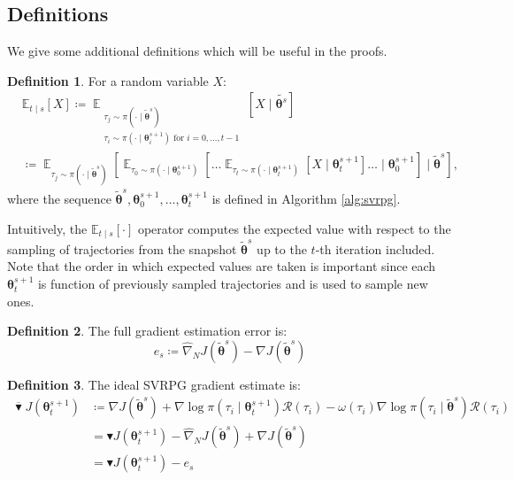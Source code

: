 \documentclass{article}
\theoremstyle{remark}
\theoremstyle{definition}
\newtheorem{definition}{Definition}[section]
\DeclareMathOperator*{\EV}{\mathbb{E}}
\newcommand{\EVV}[2][\ppvect \in \ppspace]{\EV_{#1}\left[{#2}\right]}
\newcommand{\vtheta}{\boldsymbol{\theta}}
\newcommand{\Reward}{\mathcal{R}}
\newcommand{\gradJ}[1]{\nabla J(#1)}
\newcommand{\gradApp}[2]{\hat{\nabla}_{#2}J(#1)}
\newcommand{\Ets}[2][t]{\mathbb{E}_{#1\mid s}\left[#2\right]}
\newcommand{\gradBlack}[1]{\blacktriangledown J(#1)}
\begin{document}
\subsection*{Definitions}
We give some additional definitions which will be useful in the proofs.
\begin{definition}
For a random variable $X$:
\begin{align*}
	&\mathbb{E}_{t\mid s}\left[X\right] \coloneqq 
		\mathop{\mathbb{E}}_{\substack{\tau_j\sim\pi(\cdot\mid\tilde{\vtheta}^s) \\ \tau_i\sim\pi(\cdot\mid\vtheta^{s+1}_i)\text{ for $i=0,\dots,t-1$}}}{\left[X \mid \tilde{\vtheta^s}\right]} \\
	&\coloneqq \EVV[\tau_j\sim\pi(\cdot\mid\tilde{\vtheta}^s)]{
			\EVV[\tau_0\sim\pi(\cdot\mid\vtheta_0^{s+1})]
				{\dots
					\EVV[\tau_t\sim\pi(\cdot\mid\vtheta_t^{s+1})]
						{X\mid\vtheta_t^{s+1}}
				 \dots
			\mid\vtheta_0^{s+1}}
		\mid\tilde{\vtheta}^s},
\end{align*}
where the sequence $\tilde{\vtheta}^s,\vtheta_0^{s+1},\dots,\vtheta_t^{s+1}$ is defined in Algorithm \ref{alg:svrpg}. 
\end{definition}
Intuitively, the $\Ets{\cdot}$ operator computes the expected value with respect to the sampling of trajectories from the snapshot $\tilde{\vtheta}^s$ up to the $t$-th iteration included. Note that the order in which expected values are taken is important since each $\vtheta_{t}^{s+1}$ is function of previously sampled trajectories and is used to sample new ones.

\begin{definition}
The full gradient estimation error is:
\[
	e_s \coloneqq \gradApp{\tilde{\vtheta}^s}{N} - \gradJ{\tilde{\vtheta}^s} 
\]
\end{definition}

\begin{definition}\label{def:ideal}
The ideal SVRPG gradient estimate is:
\begin{align*}
	\overline{\blacktriangledown}J(\vtheta_t^{s+1}) &\coloneqq 
	\gradJ{\tilde{\vtheta}^s}
	+ \nabla\log\pi(\tau_i \mid \vtheta_t^{s+1})\Reward(\tau_i) 
	- \omega(\tau_i)\nabla\log\pi(\tau_i \mid \tilde{\vtheta}^s)\Reward(\tau_i) \\
	&= \gradBlack{\vtheta_t^{s+1}} - \gradApp{\tilde{\vtheta}^s}{N} + \gradJ{\tilde{\vtheta}^s} \\
	&= \gradBlack{\vtheta_t^{s+1}} - e_s
\end{align*}
\end{definition}
\end{document}
